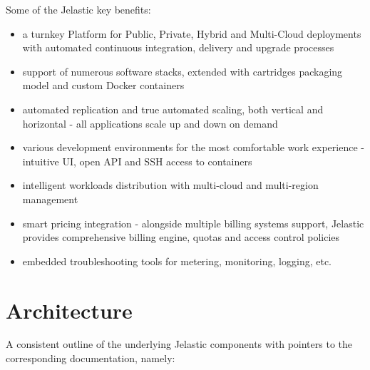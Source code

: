 \documentclass[9pt,twocolumn,twoside]{../../styles/osajnl}
\begin{document}
Some of the Jelastic key benefits:
\begin{itemize}
\renewcommand{\labelitemi}{\scriptsize$\square$}
\item a turnkey Platform for Public, Private, Hybrid and Multi-Cloud deployments
with automated continuous integration, delivery and upgrade processes
\item support of numerous software stacks, extended with cartridges packaging
model and custom Docker containers\cite{www-jelastic2}
\item automated replication and true automated scaling, both vertical and
horizontal - all applications scale up and down on demand
\item various development environments for the most comfortable work experience
- intuitive UI, open API and SSH access to containers
\item intelligent workloads distribution with multi-cloud and multi-region
management\cite{paper-jelastic2}
\item smart pricing integration - alongside multiple billing systems support, 
Jelastic provides comprehensive billing engine, quotas and access control
policies
\item embedded troubleshooting tools for metering, monitoring, logging, etc.
\end{itemize}\cite{www-jelastic1}

\section{Architecture}
A consistent outline of the underlying Jelastic components with pointers to the
corresponding documentation, namely:\cite{www-jelastic3}
%
\end{document}
